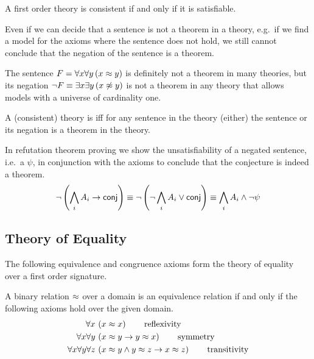 \begin{lemma}
	A first order theory is consistent if and only if it is satisfiable.
\end{lemma}
%
Even if we can decide that a sentence is not a theorem in a theory,
e.g.~if we find a model for the axioms where the sentence does not hold,
we still cannot conclude that the negation of the sentence is a theorem.
\begin{example}
	The sentence \( F = \forall x \forall y\, (x\approx y) \) is definitely not a theorem in many theories, but its negation \( \lnot F \equiv \exists x \exists y\, (x \not\approx y) \) is not a theorem in any theory that allows models with a universe of cardinality one.
\end{example}
\begin{definition}\label{def:complete:theory}
	A (consistent) theory is  iff for any sentence in the theory (either) the sentence or its negation is a theorem in the theory.
\end{definition}
%
\begin{remark}
In refutation theorem proving
we show the unsatisfiability
of a negated sentence,
i.e.~a  \( \psi \),
in conjunction with the axioms
to conclude that the conjecture is indeed a theorem.
\[
	\lnot\left(\bigwedge_i A_i \rightarrow \mathsf{conj}\right) \equiv
	\lnot\left(\lnot\bigwedge_i A_i \lor \mathsf{conj}\right) \equiv
	\bigwedge_i A_i \land \lnot \mathsf{\psi}
\]
\end{remark}

\subsection{Theory of Equality}

The following equivalence and congruence axioms form the theory of equality over a first order signature.

\begin{definition}
	[Equivalence] A binary relation \( \approx \) over a domain
	is an equivalence relation if and only if the following axioms hold over the given domain.\label{def:equivalence:axioms}
\begin{align*}
\forall x\,
&\left(x \approx x\right)
\tag*{reflexivity}
\\
\forall x \forall y\,
&\left(x \approx y \rightarrow y \approx x \right)
\tag*{symmetry}
\\
\forall x \forall y \forall z\,
&\left(x \approx y \land y\approx z \rightarrow x\approx z\right)
\tag*{transitivity}
\end{align*}
\end{definition}

